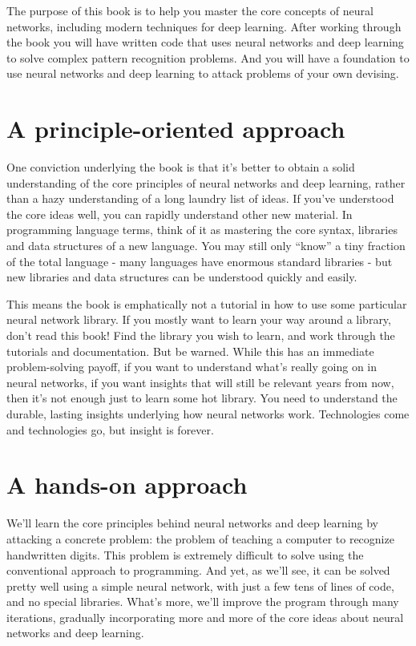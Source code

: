 The purpose of this book is to help you master the core concepts of neural networks, including modern techniques for deep learning. After working through the book you will have written code that uses neural networks and deep learning to solve complex pattern recognition problems. And you will have a foundation to use neural networks and deep learning to attack problems of your own devising.

\section*{A principle-oriented approach}

One conviction underlying the book is that it's better to obtain a solid understanding of the core principles of neural networks and deep learning, rather than a hazy understanding of a long laundry list of ideas. If you've understood the core ideas well, you can rapidly understand other new material. In programming language terms, think of it as mastering the core syntax, libraries and data structures of a new language. You may still only ``know'' a tiny fraction of the total language - many languages have enormous standard libraries - but new libraries and data structures can be understood quickly and easily.

This means the book is emphatically not a tutorial in how to use some particular neural network library. If you mostly want to learn your way around a library, don't read this book! Find the library you wish to learn, and work through the tutorials and documentation. But be warned. While this has an immediate problem-solving payoff, if you want to understand what's really going on in neural networks, if you want insights that will still be relevant years from now, then it's not enough just to learn some hot library. You need to understand the durable, lasting insights underlying how neural networks work. Technologies come and technologies go, but insight is forever.

\section*{A hands-on approach}

We'll learn the core principles behind neural networks and deep learning by attacking a concrete problem: the problem of teaching a computer to recognize handwritten digits. This problem is extremely difficult to solve using the conventional approach to programming. And yet, as we'll see, it can be solved pretty well using a simple neural network, with just a few tens of lines of code, and no special libraries. What's more, we'll improve the program through many iterations, gradually incorporating more and more of the core ideas about neural networks and deep learning.

